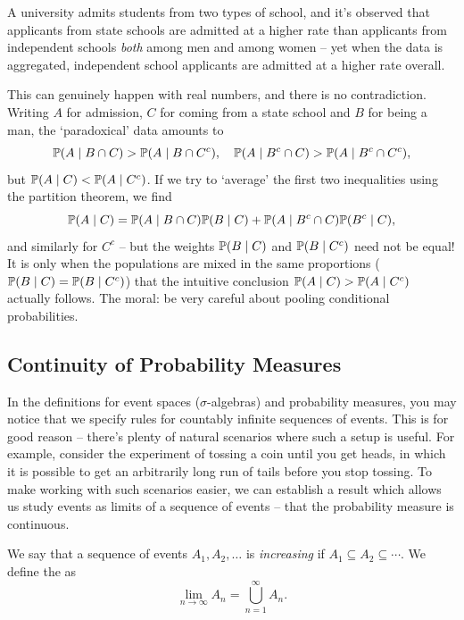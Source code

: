 \documentclass[a4paper]{scrartcl}
\begin{document}
\begin{example}
	A university admits students from two types of school, and it's observed that applicants from state schools are admitted at a higher rate than applicants from independent schools \emph{both} among men and among women -- yet when the data is aggregated, independent school applicants are admitted at a higher rate overall.

	This can genuinely happen with real numbers, and there is no contradiction. Writing $A$ for admission, $C$ for coming from a state school and $B$ for being a man, the `paradoxical' data amounts to
	$$
	\mathbb{P}(A \mid B \cap C) > \mathbb{P}(A \mid B \cap C^c), \quad \mathbb{P}(A \mid B^c \cap C) > \mathbb{P}(A \mid B^c \cap C^c),
	$$
	but $\mathbb{P}(A \mid C) < \mathbb{P}(A \mid C^c)$. If we try to `average' the first two inequalities using the partition theorem, we find
	$$
	\mathbb{P}(A \mid C) = \mathbb{P}(A \mid B \cap C)\mathbb{P}(B \mid C) + \mathbb{P}(A \mid B^c \cap C) \mathbb{P}(B^c \mid C),
	$$
	and similarly for $C^c$ -- but the weights $\mathbb{P}(B \mid C)$ and $\mathbb{P}(B \mid C^c)$ need not be equal! It is only when the populations are mixed in the same proportions ($\mathbb{P}(B \mid C) = \mathbb{P}(B \mid C^c)$) that the intuitive conclusion $\mathbb{P}(A \mid C) > \mathbb{P}(A \mid C^c)$ actually follows. The moral: be very careful about pooling conditional probabilities.
\end{example}

\subsection{Continuity of Probability Measures}

In the definitions for event spaces ($\sigma$-algebras) and probability measures, you may notice that we specify rules for countably infinite sequences of events. This is for good reason -- there's plenty of natural scenarios where such a setup is useful. For example, consider the experiment of tossing a coin until you get heads, in which it is possible to get an arbitrarily long run of tails before you stop tossing. To make working with such scenarios easier, we can establish a result which allows us study events as limits of a sequence of events -- that the probability measure is continuous.


\begin{definition}
	We say that a sequence of events $A_1, A_2, \dots$ is \emph{increasing} if $A_1 \subseteq A_2 \subseteq \cdots$. We define the  as
	$$
	\lim_{n \to \infty} A_n = \bigcup_{n = 1}^{\infty} A_n.
	$$
\end{definition}
\end{document}
